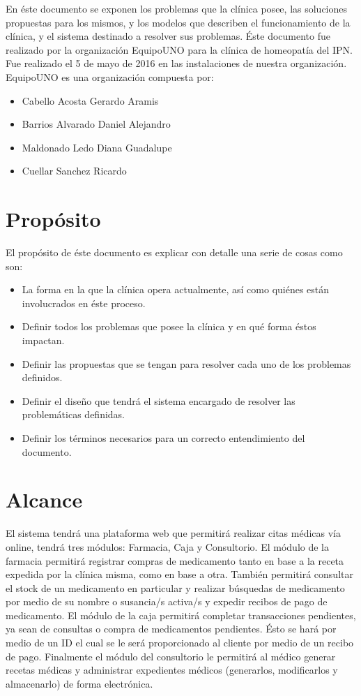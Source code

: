

En \'este documento se exponen los problemas que la cl\'inica posee, las soluciones propuestas para los mismos, y los modelos que describen el funcionamiento de la cl\'inica, y el sistema destinado a resolver sus problemas. 
\'Este documento fue realizado por la organizaci\'on EquipoUNO para la cl\'inica de homeopat\'ia del IPN. Fue realizado el 5 de mayo de 2016 en las instalaciones de nuestra organizaci\'on.
EquipoUNO es una organizaci\'on compuesta por:
\begin{itemize}
\item Cabello Acosta Gerardo Aramis
\item Barrios Alvarado Daniel Alejandro
\item Maldonado Ledo Diana Guadalupe
\item Cuellar Sanchez Ricardo
\end{itemize}

\section{Propósito}
El prop\'osito de \'este documento es explicar con detalle una serie de cosas como son:
\begin{itemize}
\item La forma en la que la cl\'inica opera actualmente, as\'i como qui\'enes est\'an involucrados en \'este proceso.
\item Definir todos los problemas que posee la cl\'inica y en qu\'e forma \'estos impactan.
\item Definir las propuestas que se tengan para resolver cada uno de los problemas definidos.
\item Definir el diseño que tendr\'a el sistema encargado de resolver las problem\'aticas definidas.
\item Definir los t\'erminos necesarios para un correcto entendimiento del documento.
\end{itemize}

\section{Alcance}
El sistema tendr\'a una plataforma web que permitir\'a realizar citas m\'edicas v\'ia online, tendr\'a tres m\'odulos: Farmacia, Caja y Consultorio. 
El m\'odulo de la farmacia permitir\'a registrar compras de medicamento tanto en base a la receta expedida por la cl\'inica misma, como en base a otra. Tambi\'en permitir\'a consultar el stock de un medicamento en particular y realizar b\'usquedas de medicamento por medio de su nombre o susancia/s activa/s y expedir recibos de pago de medicamento.
El m\'odulo de la caja permitir\'a completar transacciones pendientes, ya sean de consultas o compra de medicamentos pendientes. \'Esto se har\'a por medio de un ID el cual se le ser\'a proporcionado al cliente por medio de un recibo de pago.
Finalmente el m\'odulo del consultorio le permitir\'a al m\'edico generar recetas m\'edicas y administrar expedientes m\'edicos (generarlos, modificarlos y almacenarlo) de forma electr\'onica.


